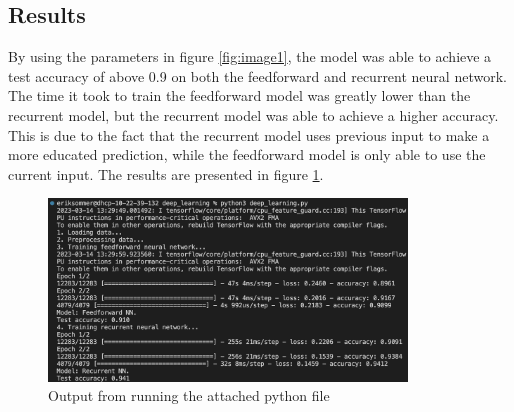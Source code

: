 \documentclass{article}
\begin{document}
\newpage
\subsection*{Results}

By using the parameters in figure \ref{fig:image1}, the model was able to achieve a test accuracy of above 0.9 on both the feedforward and recurrent neural network.
The time it took to train the feedforward model was greatly lower than the recurrent model, but the recurrent model was able to achieve a higher accuracy.
This is due to the fact that the recurrent model uses previous input to make a more educated prediction, while the feedforward model is only able to use the current input.
The results are presented in figure \ref{fig:image2}.

\begin{figure}[hbtp]
    \centering
    \includegraphics[width=0.85\textwidth]{output.png}
    \caption{Output from running the attached python file}
    \label{fig:image2}
\end{figure}
\end{document}
